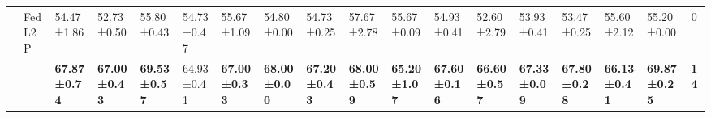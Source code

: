 \begin{table*}[]
\begin{scriptsize}
{\begin{tabular}{c|l|l|l|l|l|l|l|l|l|l|l|l|l|l|l|l|c}
                    & FedL2P                               & 54.47±1.86                       & 52.73±0.50                        & 55.80±0.43                        & 54.73±0.47                       & 55.67±1.09                       & 54.80±0.00                        & 54.73±0.25                       & 57.67±2.78                       & 55.67±0.09                       & 54.93±0.41                       & 52.60±2.79                        & 53.93±0.41                       & 53.47±0.25                       & 55.60±2.12                        & 55.20±0.00                        & 0             \\ %
                    & \method{}                                 & \textbf{67.87±0.74}              & \textbf{67.00±0.43}               & \textbf{69.53±0.57}              & 64.93±0.41                       & \textbf{67.00±0.33}               & \textbf{68.00±0.00}                & \textbf{67.20±0.43}               & \textbf{68.00±0.59}               & \textbf{65.20±1.07}               & \textbf{67.60±0.16}               & \textbf{66.60±0.57}               & \textbf{67.33±0.09}              & \textbf{67.80±0.28}               & \textbf{66.13±0.41}              & \textbf{69.87±0.25}              & \textbf{14}   \\ \bottomrule
\end{tabular}
}
\end{scriptsize}
\vspace{-1.5em}
\end{table*}